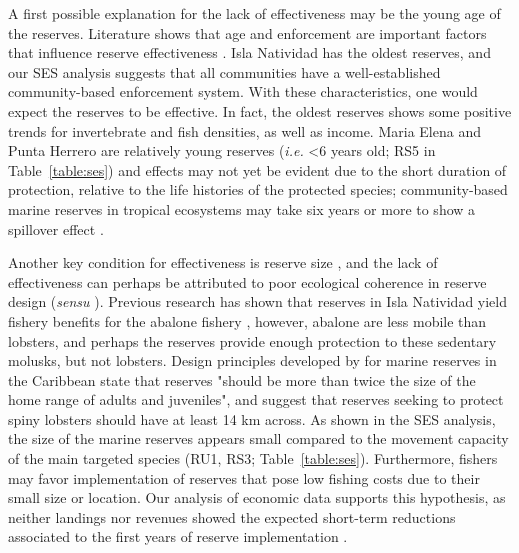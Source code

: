 \documentclass[10pt,letterpaper]{article}
\begin{document}
A first possible explanation for the lack of effectiveness may be the young age of the reserves. Literature shows that age and enforcement are important factors that influence reserve effectiveness \cite{edgar_2014-UO,babcock_2010}. Isla Natividad has the oldest reserves, and our SES analysis suggests that all communities have a well-established community-based enforcement system. With these characteristics, one would expect the reserves to be effective. In fact, the oldest reserves shows some positive trends for invertebrate and fish densities, as well as income. Maria Elena and Punta Herrero are relatively young reserves (\emph{i.e.} \textless 6 years old; RS5 in Table~\ref{table:ses}) and effects may not yet be evident due to the short duration of protection, relative to the life histories of the protected species; community-based marine reserves in tropical ecosystems may take six years or more to show a spillover effect \cite{dasilva_2015-zX}. 

Another key condition for effectiveness is reserve size \cite{edgar_2014-UO}, and the lack of effectiveness can perhaps be attributed to poor ecological coherence in reserve design (\emph{sensu} \cite{rees_2018}). Previous research has shown that reserves in Isla Natividad yield fishery benefits for the abalone fishery \cite{rossetto_2015-V0}, however, abalone are less mobile than lobsters, and perhaps the reserves provide enough protection to these sedentary molusks, but not lobsters. Design principles developed by \cite{green_2017} for marine reserves in the Caribbean state that reserves "should be more than twice the size of the home range of adults and juveniles", and suggest that reserves seeking to protect spiny lobsters should have at least 14 km across. As shown in the SES analysis, the size of the marine reserves appears small compared to the movement capacity of the main targeted species (RU1, RS3; Table~\ref{table:ses}). Furthermore, fishers may favor implementation of reserves that pose low fishing costs due to their small size or location. Our analysis of economic data supports this hypothesis, as neither landings nor revenues showed the expected short-term reductions associated to the first years of reserve implementation \cite{ovando_2016-Wg}.
\end{document}
